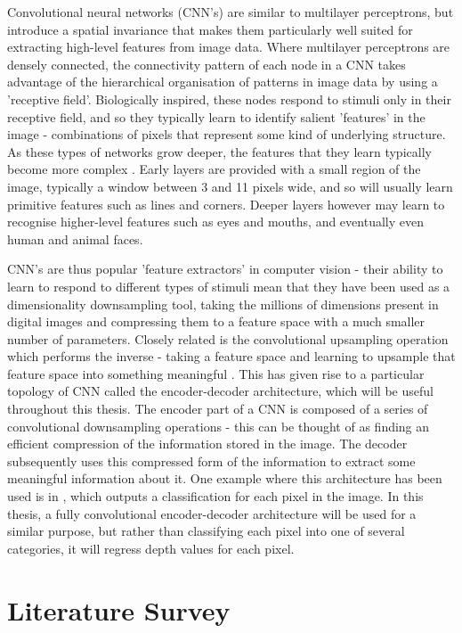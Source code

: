 \documentclass[openany]{book}
\begin{document}
Convolutional neural networks (CNN's) are similar to multilayer perceptrons, but introduce a spatial invariance that makes them particularly well suited for extracting high-level features from image data. Where multilayer perceptrons are densely connected, the connectivity pattern of each node in a CNN takes advantage of the hierarchical organisation of patterns in image data by using a 'receptive field'. Biologically inspired, these nodes respond to stimuli only in their receptive field, and so they typically learn to identify salient 'features' in the image - combinations of pixels that represent some kind of underlying structure. As these types of networks grow deeper, the features that they learn typically become more complex \cite{lecun1989cnn}. Early layers are provided with a small region of the image, typically a window between 3 and 11 pixels wide, and so will usually learn primitive features such as lines and corners. Deeper layers however may learn to recognise higher-level features such as eyes and mouths, and eventually even human and animal faces.



CNN's are thus popular 'feature extractors' in computer vision - their ability to learn to respond to different types of stimuli mean that they have been used as a dimensionality downsampling tool, taking the millions of dimensions present in digital images  and compressing them to a feature space with a much smaller number of parameters. Closely related is the convolutional upsampling operation which performs the inverse - taking a feature space and learning to upsample that feature space into something meaningful \cite{long2014fcn}. This has given rise to a particular topology of CNN called the encoder-decoder architecture, which will be useful throughout this thesis. The encoder part of a CNN is composed of a series of convolutional downsampling operations - this can be thought of as finding an efficient compression of the information stored in the image. The decoder subsequently uses this compressed form of the information to extract some meaningful information about it. One example where this architecture has been used is in \cite{long2014fcn}, which outputs a classification for each pixel in the image. In this thesis, a fully convolutional encoder-decoder architecture will be used for a similar purpose, but rather than classifying each pixel into one of several categories, it will regress depth values for each pixel. 

\chapter{Literature Survey}
\end{document}
